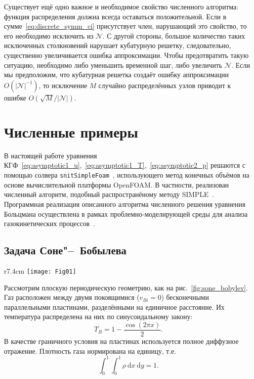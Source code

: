 \documentclass[
aps,%
12pt,%
final,%
notitlepage,%
oneside,%
onecolumn,%
nobibnotes,%
nofootinbib,%
superscriptaddress,%
noshowpacs,%
centertags]%
{revtex4}
\newcommand{\dd}{\:\mathrm{d}}
\newcommand{\OO}[1]{O\left(#1\right)}
\begin{document}
Существует ещё одно важное и необходимое свойство численного алгоритма:
функция распределения должна всегда оставаться положительной.
Если в сумме~\eqref{eq:discrete_symm_ci} присутствует член, нарушающий это свойство,
то его необходимо исключить из \(\mathcal{N}\).
С другой стороны, большое количество таких исключенных столкновений
нарушает кубатурную решетку, следовательно, существенно увеличивается ошибка аппроксимации.
Чтобы предотвратить такую ситуацию, необходимо либо уменьшить временной шаг, либо увеличить \(\mathcal{N}\).
Если мы предположим, что кубатурная решетка создаёт ошибку аппроксимации \(\OO{|\mathcal{N}|^{-1}}\),
то исключение \(M\) случайно распределённых узлов приводит к ошибке \(\OO{\sqrt{M}/|\mathcal{N}|}\).

\section{Численные примеры}

В настоящей работе уравнения КГФ~\eqref{eq:asymptotic1_u},~\eqref{eq:asymptotic1_T},~\eqref{eq:asymptotic2_p}
решаются с помощью солвера \verb+snitSimpleFoam+~\cite{Rogozin2014},
использующего метод конечных объёмов на основе вычислительной платформы OpenFOAM\textregistered{}.
В частности, реализован численный алгоритм, подобный распространёному методу SIMPLE~\cite{Aoki2007}.
Программная реализация описанного алгоритма численного решения уравнения Больцмана
осуществлена в рамках проблемно-моделирующей среды
для анализа газокинетических процессов~\cite{Kloss2011, Kloss2012}.

\subsection{Задача Соне"--~Бобылева}

\begin{wrapfigure}{r}{7.4cm}
    \vspace{-10pt}
    \centering
    \texttt{[image: Fig01]}
    \vspace{-20pt}
    \caption{Геометрия задачи}\label{fig:sone_bobylev}
    \vspace{20pt}
\end{wrapfigure}

Рассмотрим плоскую периодическую геометрию, как на рис.~\ref{fig:sone_bobylev}.
Газ расположен между двумя покоящимися (\(v_{Bi} = 0\)) бесконечными параллельными пластинами,
разделёнными на единичное расстояние. Их температура распределена на них по синусоидальному закону:
\begin{equation}
    T_B = 1 - \frac{\cos(2\pi x)}{2}.
\end{equation}
В качестве граничного условия на пластинах используется полное диффузное отражение.
Плотность газа нормирована на единицу, т.е.
\begin{equation}\label{eq:total_mass}
    \int_0^1\int_0^1\rho\dd{x}\dd{y} = 1.
\end{equation}
\end{document}
